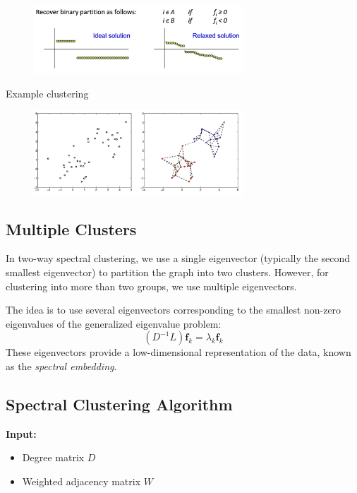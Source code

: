 \documentclass[11pt]{article}
\begin{document}
\begin{figure}[h]
	\centering
	\includegraphics[width=0.7\textwidth]{../imgs/relaxed_spec.png}
\end{figure}


Example clustering
\begin{figure}[h]
	\centering
	\includegraphics[width=0.7\textwidth]{../imgs/spec-example.png}
\end{figure}

\pagebreak

\subsection*{Multiple Clusters}

In two-way spectral clustering, we use a single eigenvector (typically the second smallest eigenvector)
to partition the graph into two clusters.
However, for clustering into more than two groups, we use multiple eigenvectors.

The idea is to use several eigenvectors corresponding to the smallest non-zero eigenvalues of the
generalized eigenvalue problem:
\[
	(D^{-1}L)\mathbf{f}_k = \lambda_k \mathbf{f}_k
\]
These eigenvectors provide a low-dimensional representation of the data, known as the \emph{spectral embedding}.

\subsection*{Spectral Clustering Algorithm}

\textbf{Input:}
\begin{itemize}
	\item Degree matrix \( D \)
	\item Weighted adjacency matrix \( W \)
\end{itemize}
\end{document}
